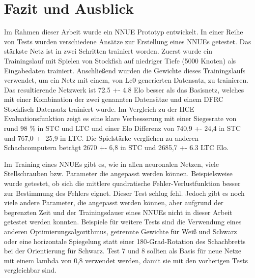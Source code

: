 \chapter{Fazit und Ausblick}

Im Rahmen dieser Arbeit wurde ein \ac{NNUE} Prototyp entwickelt. In einer Reihe von Tests wurden verschiedene Ansätze zur Erstellung eines \acp{NNUE} getestet. Das stärkste Netz ist in zwei Schritten trainiert worden. Zuerst wurde ein Trainingslauf mit Spielen von Stockfish auf niedriger Tiefe (5000 Knoten) als Eingabedaten trainiert. Anschließend wurden die Gewichte dieses Trainingslaufs verwendet, um ein Netz mit einem, von \ac{Lc0} generierten Datensatz, zu trainieren. Das resultierende Netzwerk ist 72.5 +- 4.8 Elo besser als das Basisnetz, welches mit einer Kombination der zwei genannten Datensätze und einem \ac{DFRC} Stockfisch Datensatz trainiert wurde. Im Vergleich zu der \ac{HCE} Evaluationsfunktion zeigt es eine klare Verbesserung mit einer Siegesrate von rund 98 \% in \ac{STC} und \ac{LTC} und einer Elo Differenz von 740,9 +- 24,4 in \ac{STC} und 767,0 +- 25,9 in \ac{LTC}. Die Spielstärke verglichen zu anderen Schachcomputern beträgt 2670 +- 6,8 in \ac{STC} und 2685,7 +- 6.3 \ac{LTC} Elo.

Im Training eines \acp{NNUE} gibt es, wie in allen neuronalen Netzen, viele Stellschrauben bzw. Parameter die angepasst werden können. Beispielsweise wurde getestet, ob sich die mittlere quadratische Fehler-Verlustfunktion besser zur Bestimmung des Fehlers eignet. Dieser Test schlug fehl. Jedoch gibt es noch viele andere Parameter, die angepasst werden können, aber aufgrund der begrenzten Zeit und der Trainingsdauer eines \acp{NNUE} nicht in dieser Arbeit getestet werden konnten. Beispiele für weitere Tests sind \zb{} die Verwendung eines anderen Optimierungsalgorithmus, getrennte Gewichte für Weiß und Schwarz oder eine horizontale Spiegelung statt einer 180-Grad-Rotation des Schachbretts bei der Orientierung für Schwarz. Test 7 und 8 sollten als Basis für neue Netze mit einem lambda von 0,8 verwendet werden, damit sie mit den vorherigen Tests vergleichbar sind.

